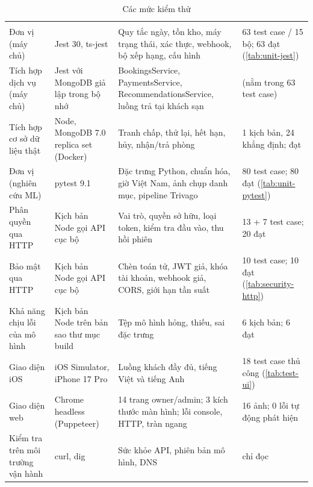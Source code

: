 \begin{rtable}
\begin{longtable}{|L{2.9cm}|L{3.5cm}|L{5.4cm}|C{2.8cm}|}
\caption{Các mức kiểm thử}\label{tab:test-levels}\\
\hline
{} &  &  &  \\ \hline
\endfirsthead
\hline
{} &  &  &  \\ \hline
\endhead
Đơn vị (máy chủ) & Jest 30, ts-jest & Quy tắc ngày, tồn kho, máy trạng thái, xác thực, webhook, bộ xếp hạng, cấu hình & 63 test case / 15 bộ; 63 đạt (\cref{tab:unit-jest}) \\ \hline
Tích hợp dịch vụ (máy chủ) & Jest với MongoDB giả lập trong bộ nhớ & BookingsService, PaymentsService, RecommendationsService, luồng trả tại khách sạn & (nằm trong 63 test case) \\ \hline
Tích hợp cơ sở dữ liệu thật & Node, MongoDB 7.0 replica set (Docker) & Tranh chấp, thử lại, hết hạn, hủy, nhận/trả phòng & 1 kịch bản, 24 khẳng định; đạt \\ \hline
Đơn vị (nghiên cứu ML) & pytest 9.1 & Đặc trưng Python, chuẩn hóa, giờ Việt Nam, ảnh chụp danh mục, pipeline Trivago & 80 test case; 80 đạt (\cref{tab:unit-pytest}) \\ \hline
Phân quyền qua HTTP & Kịch bản Node gọi API cục bộ & Vai trò, quyền sở hữu, loại token, kiểm tra đầu vào, thu hồi phiên & 13 + 7 test case; 20 đạt \\ \hline
Bảo mật qua HTTP & Kịch bản Node  gọi API cục bộ & Chèn toán tử, JWT giả, khóa tài khoản, webhook giả, CORS, giới hạn tần suất & 10 test case; 10 đạt (\cref{tab:security-http}) \\ \hline
Khả năng chịu lỗi của mô hình & Kịch bản Node trên bản sao thư mục build & Tệp mô hình hỏng, thiếu, sai đặc trưng & 6 kịch bản; 6 đạt \\ \hline
Giao diện iOS & iOS Simulator, iPhone 17 Pro & Luồng khách đầy đủ, tiếng Việt và tiếng Anh & 18 test case thủ công (\cref{tab:test-ui}) \\ \hline
Giao diện web & Chrome headless (Puppeteer) & 14 trang owner/admin; 3 kích thước màn hình; lỗi console, HTTP, tràn ngang & 16 ảnh; 0 lỗi tự động phát hiện \\ \hline
Kiểm tra trên môi trường vận hành & curl, dig & Sức khỏe API, phiên bản mô hình, DNS & chỉ đọc \\ \hline
\end{longtable}
\end{rtable}

